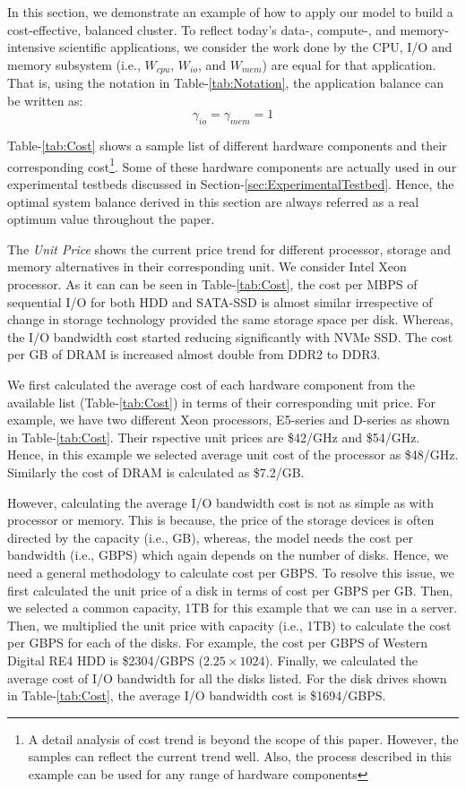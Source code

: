 \documentclass[journal]{IEEEtran}
\begin{document}
In this section, we demonstrate an example of how to apply our model to build a cost-effective, balanced cluster. To reflect today's data-, compute-, and memory-intensive scientific applications, we consider the work done by the CPU, I/O and memory subsystem (i.e., $W_{cpu}$, $W_{io}$, and $W_{mem}$) are equal for that application. That is, using the notation in Table-\ref{tab:Notation}, the application balance  can be written as:
\begin{equation} \label{eqn:PractAppBal}
\gamma_{io} = \gamma_{mem} = 1
\end{equation}

Table-\ref{tab:Cost} shows a sample list of different hardware components and their corresponding cost\footnote{A detail analysis of cost trend is beyond the scope of this paper. However, the samples can reflect the current trend well. Also, the process described in this example can be used for any range of hardware components}. Some of these hardware components are actually used in our experimental testbeds discussed in Section-\ref{sec:ExperimentalTestbed}. Hence, the optimal system balance derived in this section are always referred as a real optimum value throughout the paper. 

The \textit{Unit Price} shows the current price trend  for different processor, storage and memory alternatives in their corresponding unit. We consider Intel Xeon processor. As it can can be seen in  Table-\ref{tab:Cost}, the cost per MBPS of sequential I/O for both HDD and SATA-SSD is almost similar irrespective of change in storage technology provided the same storage space per disk. Whereas, the I/O bandwidth cost started reducing significantly with NVMe SSD. The cost per GB of DRAM is increased almost double from DDR2 to DDR3. 

We first calculated the average cost of each hardware component from the available list (Table-\ref{tab:Cost}) in terms of their corresponding unit price. For example, we have two different Xeon processors, E5-series and D-series as shown in Table-\ref{tab:Cost}. Their rspective unit prices are \$42/GHz and \$54/GHz. Hence, in this example we selected average unit cost of the processor as \$48/GHz. Similarly the cost of DRAM is calculated as \$7.2/GB. 

However, calculating the average I/O bandwidth cost is not as simple as with processor or memory. This is because, the price of the storage devices is often directed by the capacity (i.e., GB), whereas, the model needs the cost per bandwidth (i.e., GBPS) which again depends on the number of disks. Hence, we need a general methodology to calculate cost per GBPS. To resolve this issue, we first calculated the unit price of a disk in terms of cost per GBPS per GB. Then, we selected a common capacity, 1TB for this example that we can use in a server.  Then, we multiplied the unit price with capacity (i.e., 1TB) to calculate the cost per GBPS for each of the disks. For example, the cost per GBPS of Western Digital RE4 HDD is \$2304/GBPS ($2.25 \times 1024$). Finally, we calculated the average cost of I/O bandwidth for all the disks listed. For the disk drives shown in Table-\ref{tab:Cost}, the average I/O bandwidth cost is \$1694/GBPS. 
\end{document}
